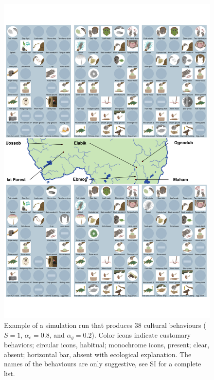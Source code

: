 \documentclass[9pt,twocolumn,twoside,]{pnas-new}
\begin{document}
\begin{figure}[h!]
\begin{center}
\includegraphics[width=13.8cm]{figures/figure_2.pdf}
\caption{Example of a simulation run that produces 38 cultural behaviours ($S=1$, $\alpha_e=0.8$, and $\alpha_g=0.2$). Color icons indicate customary behaviors; circular icons, habitual; monochrome icons, present; clear, absent;  horizontal bar, absent with ecological explanation. The names of the behaviours are only suggestive, see SI for a complete list.}
\label{Figure2}
\end{center}
\end{figure}
\end{document}
